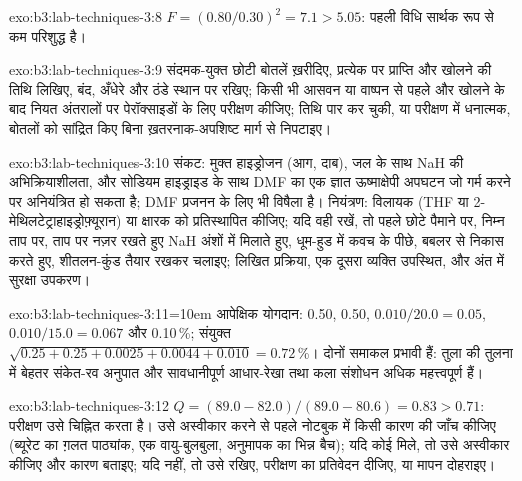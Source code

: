 \begin{solution}{exo:b3:lab-techniques-3:8}
$F = (0.80/0.30)^2 = 7.1 > 5.05$: पहली विधि सार्थक रूप से कम परिशुद्ध है।
\end{solution}

\begin{solution}{exo:b3:lab-techniques-3:9}
संदमक-युक्त छोटी बोतलें ख़रीदिए, प्रत्येक पर प्राप्ति और खोलने की तिथि लिखिए, बंद,
अँधेरे और ठंडे स्थान पर रखिए; किसी भी आसवन या वाष्पन से पहले और खोलने के बाद
नियत अंतरालों पर पेरॉक्साइडों के लिए परीक्षण कीजिए; तिथि पार कर चुकी, या परीक्षण में धनात्मक,
बोतलों को सांद्रित किए बिना ख़तरनाक-अपशिष्ट मार्ग से निपटाइए।
\end{solution}

\begin{solution}{exo:b3:lab-techniques-3:10}
संकट: मुक्त हाइड्रोजन (आग, दाब), जल के साथ NaH की अभिक्रियाशीलता,
और सोडियम हाइड्राइड के साथ DMF का एक ज्ञात ऊष्माक्षेपी अपघटन जो गर्म करने पर
अनियंत्रित हो सकता है; DMF प्रजनन के लिए भी विषैला है। नियंत्रण: विलायक (THF या
2-मेथिलटेट्राहाइड्रोफ़्यूरान) या क्षारक को प्रतिस्थापित कीजिए; यदि वही रखें, तो पहले छोटे पैमाने पर, निम्न
ताप पर, ताप पर नज़र रखते हुए NaH अंशों में मिलाते हुए, धूम-हुड में कवच के
पीछे, बबलर से निकास करते हुए, शीतलन-कुंड तैयार रखकर चलाइए; लिखित
प्रक्रिया, एक दूसरा व्यक्ति उपस्थित, और अंत में सुरक्षा उपकरण।
\end{solution}

\begin{solution}{exo:b3:lab-techniques-3:11}\emergencystretch=10em
आपेक्षिक योगदान: 0.50, 0.50, $0.010/20.0 = 0.05$, $0.010/15.0 = 0.067$ और 0.10\,\%; संयुक्त
$\sqrt{0.25 + 0.25 + 0.0025 + 0.0044 + 0.010} = 0.72$\,\%। दोनों समाकल प्रभावी हैं: तुला की तुलना में बेहतर संकेत-रव अनुपात और
सावधानीपूर्ण आधार-रेखा तथा कला संशोधन अधिक महत्त्वपूर्ण हैं।
\end{solution}

\begin{solution}{exo:b3:lab-techniques-3:12}
$Q = (89.0 - 82.0)/(89.0 - 80.6) = 0.83 > 0.71$: परीक्षण उसे चिह्नित करता है। उसे अस्वीकार करने से पहले नोटबुक में
किसी कारण की जाँच कीजिए (ब्यूरेट का ग़लत पाठ्यांक, एक वायु-बुलबुला, अनुमापक का भिन्न बैच); यदि कोई
मिले, तो उसे अस्वीकार कीजिए और कारण बताइए; यदि नहीं, तो उसे रखिए, परीक्षण का प्रतिवेदन दीजिए, या
मापन दोहराइए।
\end{solution}

